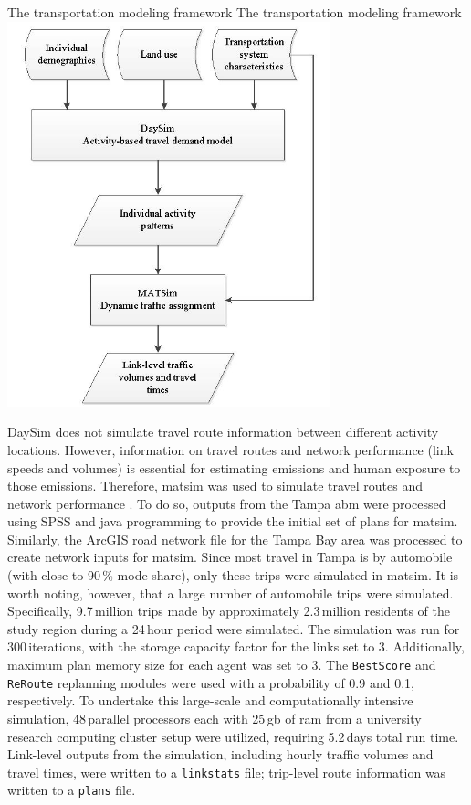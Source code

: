 \createfigure%
{The transportation modeling framework}%
{The transportation modeling framework}%
{\label{fig:tampa-fig2}}%
{\includegraphics[width=0.7\textwidth, angle=0]{./scenarios/figures/tampa-fig2.jpg}}%
{}

DaySim does not simulate travel route information between different activity locations. 
However, information on travel routes and network performance (\ie link speeds and volumes) is essential for estimating emissions and human exposure to those emissions. 
Therefore, \gls{matsim} was used to simulate travel routes and network performance %
\citep[][]{BalmerEtAl2008ITMStructurePerformance}.
To do so, outputs from the Tampa \gls{abm} were processed using SPSS and \gls{java} programming to provide the initial set of plans for \gls{matsim}. 
Similarly, the ArcGIS road network file for the Tampa Bay area was processed to create network inputs for \gls{matsim}. 
Since most travel in Tampa is by automobile (with close to 90\,\% mode share), only these trips were simulated in \gls{matsim}. 
It is worth noting, however, that a large number of automobile trips were simulated. 
Specifically, 9.7\,million trips made by approximately 2.3\,million residents of the study region during a 24\,hour period were simulated. 
The simulation was run for 300\,iterations, with the storage capacity factor for the links set to 3. 
Additionally, maximum plan memory size for each agent was set to 3. The \lstinline|BestScore| and \lstinline|ReRoute| replanning modules were used with a probability of 0.9 and 0.1, respectively. 
To undertake this large-scale and computationally intensive simulation, 48\,parallel processors each with 25\,\gls{gb} of \gls{ram} from a university research computing cluster setup were utilized, requiring 5.2\,days total run time. 
Link-level outputs from the simulation, including hourly traffic volumes and travel times, were written to a \lstinline|linkstats| file;  trip-level route information was written to a \lstinline|plans| file.

